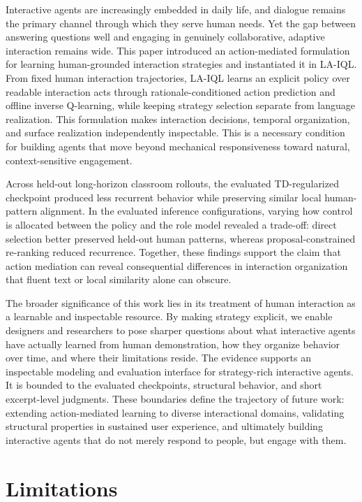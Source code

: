 \documentclass[manuscript,review,anonymous]{acmart}
\begin{document}
Interactive agents are increasingly embedded in daily life, and dialogue
remains the primary channel through which they serve human needs. Yet the gap
between answering questions well and engaging in genuinely collaborative,
adaptive interaction remains wide. This paper introduced an action-mediated
formulation for learning human-grounded interaction strategies and instantiated
it in LA-IQL. From fixed human interaction trajectories, LA-IQL learns an
explicit policy over readable interaction acts through rationale-conditioned
action prediction and offline inverse Q-learning, while keeping strategy
selection separate from language realization. This formulation makes
interaction decisions, temporal organization, and surface realization
independently inspectable. This is a necessary condition for building agents
that move beyond mechanical responsiveness toward natural, context-sensitive
engagement.

Across held-out long-horizon classroom rollouts, the evaluated TD-regularized
checkpoint produced less recurrent behavior while preserving similar local
human-pattern alignment. In the evaluated inference configurations, varying how
control is allocated between the policy and the role model revealed a trade-off:
direct selection better preserved held-out human patterns, whereas
proposal-constrained re-ranking reduced recurrence. Together, these findings support the claim that action
mediation can reveal consequential differences in interaction organization
that fluent text or local similarity alone can obscure.

The broader significance of this work lies in its treatment of human
interaction as a learnable and inspectable resource. By making strategy
explicit, we enable designers and researchers to pose sharper questions about
what interactive agents have actually learned from human demonstration, how
they organize behavior over time, and where their limitations reside. The
evidence supports an inspectable modeling and evaluation interface for
strategy-rich interactive agents. It is bounded to the evaluated checkpoints,
structural behavior, and short excerpt-level judgments. These boundaries define
the trajectory of future work: extending action-mediated learning to diverse
interactional domains, validating structural properties in sustained user
experience, and ultimately
building interactive agents that do not merely respond to people, but engage
with them.

\label{main-content-end}

\section*{Limitations}
\end{document}
